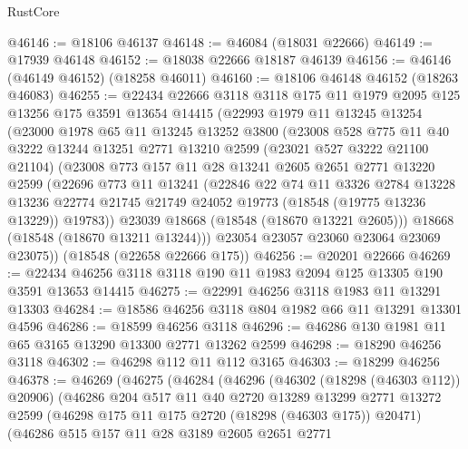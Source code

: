 \begin{lexlean}{RustCore}
\begin{coremodule}
@46146 := @18106 @46137
@46148 := @46084 (@18031 @22666)
@46149 := @17939 @46148
@46152 := @18038 @22666 @18187 @46139
@46156 := @46146 (@46149 @46152) (@18258 @46011)
@46160 := @18106 @46148 @46152 (@18263 @46083)
@46255 := @22434
    @22666
    @3118
    @3118
    @175
    @11
    @1979
    @2095
    @125
    @13256
    @175
    @3591
    @13654
    @14415
    (@22993
      @1979
      @11
      @13245
      @13254
      (@23000
        @1978
        @65
        @11
        @13245
        @13252
        @3800
        (@23008
          @528
          @775
          @11
          @40
          @3222
          @13244
          @13251
          @2771
          @13210
          @2599
          (@23021 @527 @3222 @21100 @21104)
          (@23008
            @773
            @157
            @11
            @28
            @13241
            @2605
            @2651
            @2771
            @13220
            @2599
            (@22696
              @773
              @11
              @13241
              (@22846
                @22
                @74
                @11
                @3326
                @2784
                @13228
                @13236
                @22774
                @21745
                @21749
                @24052
                @19773
                (@18548 (@19775 @13236 @13229))
                @19783))
            @23039
            @18668
            (@18548 (@18670 @13221 @2605)))
          @18668
          (@18548 (@18670 @13211 @13244)))
        @23054
        @23057
        @23060
        @23064
        @23069
        @23075))
    (@18548 (@22658 @22666 @175))
@46256 := @20201 @22666
@46269 := @22434 @46256 @3118 @3118 @190 @11 @1983 @2094 @125 @13305 @190 @3591 @13653 @14415
@46275 := @22991 @46256 @3118 @1983 @11 @13291 @13303
@46284 := @18586 @46256 @3118 @804 @1982 @66 @11 @13291 @13301 @4596
@46286 := @18599 @46256 @3118
@46296 := @46286 @130 @1981 @11 @65 @3165 @13290 @13300 @2771 @13262 @2599
@46298 := @18290 @46256 @3118
@46302 := @46298 @112 @11 @112 @3165
@46303 := @18299 @46256
@46378 := @46269
    (@46275
      (@46284
        (@46296
          (@46302 (@18298 (@46303 @112)) @20906)
          (@46286
            @204
            @517
            @11
            @40
            @2720
            @13289
            @13299
            @2771
            @13272
            @2599
            (@46298 @175 @11 @175 @2720 (@18298 (@46303 @175)) @20471)
            (@46286
              @515
              @157
              @11
              @28
              @3189
              @2605
              @2651
              @2771

\end{coremodule}
\end{lexlean}
